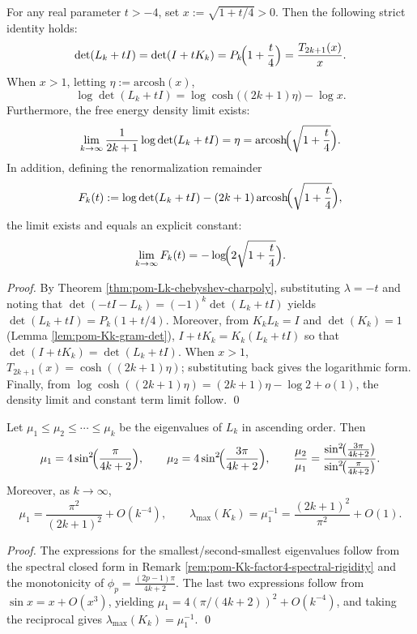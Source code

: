 \begin{corollary}\label{cor:pom-Lk-shifted-det-free-energy}
For any real parameter \(t>-4\), set \(x:=\sqrt{1+t/4}>0\).
Then the following strict identity holds:
\[
\det(L_k+tI)=\det(I+tK_k)=P_k\!\Bigl(1+\frac{t}{4}\Bigr)=\frac{T_{2k+1}(x)}{x}.
\]
When \(x>1\), letting \(\eta:=\mathrm{arcosh}(x)\),
\[
\log\det(L_k+tI)=\log\cosh\bigl((2k+1)\eta\bigr)-\log x.
\]
Furthermore, the free energy density limit exists:
\[
\lim_{k\to\infty}\frac{1}{2k+1}\log\det(L_k+tI)=\eta=\mathrm{arcosh}\!\Bigl(\sqrt{1+\frac{t}{4}}\Bigr).
\]
In addition, defining the renormalization remainder
\[
F_k(t):=\log\det(L_k+tI)-(2k+1)\,\mathrm{arcosh}\!\Bigl(\sqrt{1+\frac{t}{4}}\Bigr),
\]
the limit exists and equals an explicit constant:
\[
\lim_{k\to\infty}F_k(t)=-\log\!\Bigl(2\sqrt{1+\frac{t}{4}}\Bigr).
\]
\end{corollary}
\begin{proof}
By Theorem \ref{thm:pom-Lk-chebyshev-charpoly}, substituting \(\lambda=-t\) and noting that
\(
\det(-tI-L_k)=(-1)^k\det(L_k+tI)
\)
yields \(\det(L_k+tI)=P_k(1+t/4)\).
Moreover, from \(K_kL_k=I\) and \(\det(K_k)=1\) (Lemma \ref{lem:pom-Kk-gram-det}),
\(
I+tK_k=K_k(L_k+tI)
\)
so that \(\det(I+tK_k)=\det(L_k+tI)\).
When \(x>1\), \(T_{2k+1}(x)=\cosh((2k+1)\eta)\); substituting back gives the logarithmic form.
Finally, from \(\log\cosh((2k+1)\eta)=(2k+1)\eta-\log 2+o(1)\), the density limit and constant term limit follow. \qed
\end{proof}






\begin{corollary}\label{cor:pom-Lk-gap-pi2}
Let \(\mu_1\le\mu_2\le\cdots\le\mu_k\) be the eigenvalues of \(L_k\) in ascending order. Then
\[
\mu_1=4\sin^2\!\Bigl(\frac{\pi}{4k+2}\Bigr),
\qquad
\mu_2=4\sin^2\!\Bigl(\frac{3\pi}{4k+2}\Bigr),
\qquad
\frac{\mu_2}{\mu_1}=\frac{\sin^2\!\bigl(\frac{3\pi}{4k+2}\bigr)}{\sin^2\!\bigl(\frac{\pi}{4k+2}\bigr)}.
\]
Moreover, as \(k\to\infty\),
\[
\mu_1=\frac{\pi^2}{(2k+1)^2}+O(k^{-4}),
\qquad
\lambda_{\max}(K_k)=\mu_1^{-1}=\frac{(2k+1)^2}{\pi^2}+O(1).
\]
\end{corollary}
\begin{proof}
The expressions for the smallest/second-smallest eigenvalues follow from the spectral closed form in Remark \ref{rem:pom-Kk-factor4-spectral-rigidity} and the monotonicity of \(\phi_p=\frac{(2p-1)\pi}{4k+2}\).
The last two expressions follow from \(\sin x=x+O(x^3)\), yielding \(\mu_1=4(\pi/(4k+2))^2+O(k^{-4})\), and taking the reciprocal gives \(\lambda_{\max}(K_k)=\mu_1^{-1}\). \qed
\end{proof}

